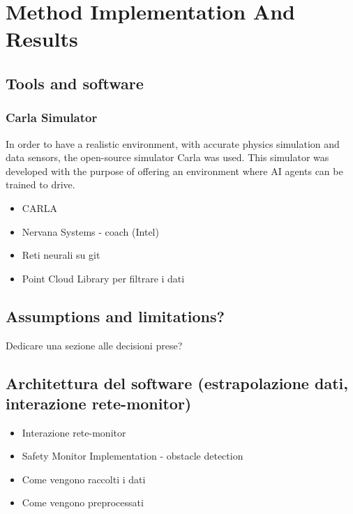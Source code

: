 \chapter{Method Implementation And Results}

\section{Tools and software}

\subsection{Carla Simulator}

In order to have a realistic environment, with accurate physics simulation and data sensors, the open-source simulator Carla was used. This simulator was developed with the purpose of offering an environment where AI agents can be trained to drive.\newline

\begin{itemize}
	\item CARLA
	\item Nervana Systems - coach (Intel)
	\item Reti neurali su git
	\item Point Cloud Library per filtrare i dati
\end{itemize}


\section{Assumptions and limitations?}

Dedicare una sezione alle decisioni prese?

\section{Architettura del software (estrapolazione dati, interazione rete-monitor)}

\begin{itemize}
	
	\item Interazione rete-monitor
	\item Safety Monitor Implementation - obstacle detection
	\item Come vengono raccolti i dati
	\item Come vengono preprocessati
	
\end{itemize}

